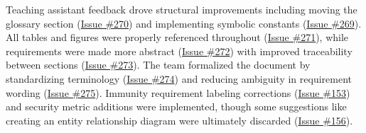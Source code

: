 \documentclass{article}
\begin{document}
Teaching assistant feedback drove structural improvements including moving the glossary section (\href{https://github.com/ssm-lab/capstone--source-code-optimizer/issues/270}{Issue \#270}) and implementing symbolic constants (\href{https://github.com/ssm-lab/capstone--source-code-optimizer/issues/269}{Issue \#269}). All tables and figures were properly referenced throughout (\href{https://github.com/ssm-lab/capstone--source-code-optimizer/issues/271}{Issue \#271}), while requirements were made more abstract (\href{https://github.com/ssm-lab/capstone--source-code-optimizer/issues/272}{Issue \#272}) with improved traceability between sections (\href{https://github.com/ssm-lab/capstone--source-code-optimizer/issues/273}{Issue \#273}). The team formalized the document by standardizing terminology (\href{https://github.com/ssm-lab/capstone--source-code-optimizer/issues/274}{Issue \#274}) and reducing ambiguity in requirement wording (\href{https://github.com/ssm-lab/capstone--source-code-optimizer/issues/275}{Issue \#275}). Immunity requirement labeling corrections (\href{https://github.com/ssm-lab/capstone--source-code-optimizer/issues/153}{Issue \#153}) and security metric additions were implemented, though some suggestions like creating an entity relationship diagram were ultimately discarded (\href{https://github.com/ssm-lab/capstone--source-code-optimizer/issues/156}{Issue \#156}).
\end{document}
